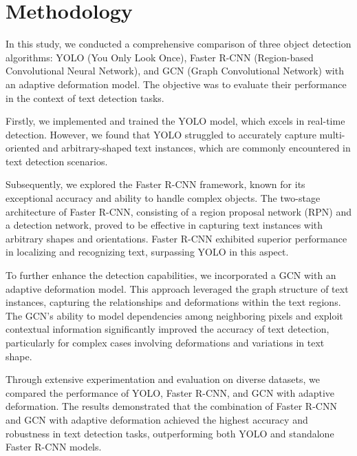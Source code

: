 \setlength{\footskip}{8mm}


\chapter{Methodology}
\label{ch:methodology}

In this study, we conducted a comprehensive comparison of three object detection algorithms: YOLO (You Only Look Once), Faster R-CNN (Region-based Convolutional Neural Network), and GCN (Graph Convolutional Network) with an adaptive deformation model. The objective was to evaluate their performance in the context of text detection tasks. 

Firstly, we implemented and trained the YOLO model, which excels in real-time detection. However, we found that YOLO struggled to accurately capture multi-oriented and arbitrary-shaped text instances, which are commonly encountered in text detection scenarios. 

Subsequently, we explored the Faster R-CNN framework, known for its exceptional accuracy and ability to handle complex objects. The two-stage architecture of Faster R-CNN, consisting of a region proposal network (RPN) and a detection network, proved to be effective in capturing text instances with arbitrary shapes and orientations. Faster R-CNN exhibited superior performance in localizing and recognizing text, surpassing YOLO in this aspect.

To further enhance the detection capabilities, we incorporated a GCN with an adaptive deformation model. This approach leveraged the graph structure of text instances, capturing the relationships and deformations within the text regions. The GCN's ability to model dependencies among neighboring pixels and exploit contextual information significantly improved the accuracy of text detection, particularly for complex cases involving deformations and variations in text shape.

Through extensive experimentation and evaluation on diverse datasets, we compared the performance of YOLO, Faster R-CNN, and GCN with adaptive deformation. The results demonstrated that the combination of Faster R-CNN and GCN with adaptive deformation achieved the highest accuracy and robustness in text detection tasks, outperforming both YOLO and standalone Faster R-CNN models.

